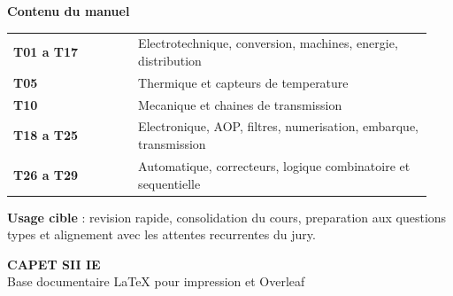 \documentclass[11pt,a4paper]{article}
\begin{document}
\begin{titlepage}
\hspace*{4.9cm}
\begin{minipage}{0.68\textwidth}
\begin{tcolorbox}[
	enhanced,
	colback=white,
	colframe=colElec,
	boxrule=0.8pt,
	arc=2mm,
	left=8pt, right=8pt, top=8pt, bottom=8pt
]
\textbf{Contenu du manuel}\\[4pt]
\begin{tabular}{p{0.28\linewidth}p{0.66\linewidth}}
\textcolor{colElec}{\textbf{T01 a T17}} & Electrotechnique, conversion, machines, energie, distribution \\
\textcolor{colTherm}{\textbf{T05}} & Thermique et capteurs de temperature \\
\textcolor{colMeca}{\textbf{T10}} & Mecanique et chaines de transmission \\
\textcolor{colElec}{\textbf{T18 a T25}} & Electronique, AOP, filtres, numerisation, embarque, transmission \\
\textcolor{colAuto}{\textbf{T26 a T29}} & Automatique, correcteurs, logique combinatoire et sequentielle
\end{tabular}
\end{tcolorbox}
\end{minipage}

\vfill

\hspace*{4.9cm}
\begin{minipage}{0.68\textwidth}
\begin{tcolorbox}[
	enhanced,
	colback=colElec!6!white,
	colframe=colElec!45,
	boxrule=0.5pt,
	arc=2mm,
	left=8pt, right=8pt, top=6pt, bottom=6pt
]
\textbf{Usage cible} : revision rapide, consolidation du cours, preparation aux questions types et alignement avec les attentes recurrentes du jury.
\vspace{0.5cm}
\end{tcolorbox}
{\large\bfseries CAPET SII IE}\\[2pt]
{\normalsize Base documentaire LaTeX pour impression et Overleaf}
\end{minipage}
\end{titlepage}

\clearpage
{}
\setcounter{page}{1}
\end{document}
